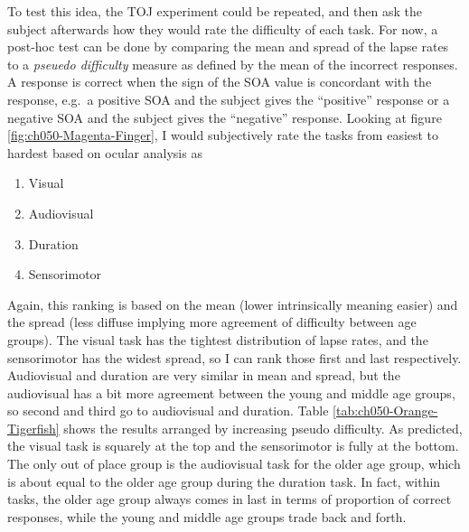 \documentclass[11pt, oneside, openany]{scrbook}
\providecommand{\tightlist}{%
  \setlength{\itemsep}{0pt}\setlength{\parskip}{0pt}}
\begin{document}
To test this idea, the TOJ experiment could be repeated, and then ask the subject afterwards how they would rate the difficulty of each task. For now, a post-hoc test can be done by comparing the mean and spread of the lapse rates to a \emph{pseuedo difficulty} measure as defined by the mean of the incorrect responses. A response is correct when the sign of the SOA value is concordant with the response, e.g.~a positive SOA and the subject gives the ``positive'' response or a negative SOA and the subject gives the ``negative'' response. Looking at figure \ref{fig:ch050-Magenta-Finger}, I would subjectively rate the tasks from easiest to hardest based on ocular analysis as

\begin{enumerate}
\def\labelenumi{\arabic{enumi}.}
\tightlist
\item
  Visual
\item
  Audiovisual
\item
  Duration
\item
  Sensorimotor
\end{enumerate}

Again, this ranking is based on the mean (lower intrinsically meaning easier) and the spread (less diffuse implying more agreement of difficulty between age groups). The visual task has the tightest distribution of lapse rates, and the sensorimotor has the widest spread, so I can rank those first and last respectively. Audiovisual and duration are very similar in mean and spread, but the audiovisual has a bit more agreement between the young and middle age groups, so second and third go to audiovisual and duration. Table \ref{tab:ch050-Orange-Tigerfish} shows the results arranged by increasing pseudo difficulty. As predicted, the visual task is squarely at the top and the sensorimotor is fully at the bottom. The only out of place group is the audiovisual task for the older age group, which is about equal to the older age group during the duration task. In fact, within tasks, the older age group always comes in last in terms of proportion of correct responses, while the young and middle age groups trade back and forth.
\end{document}
